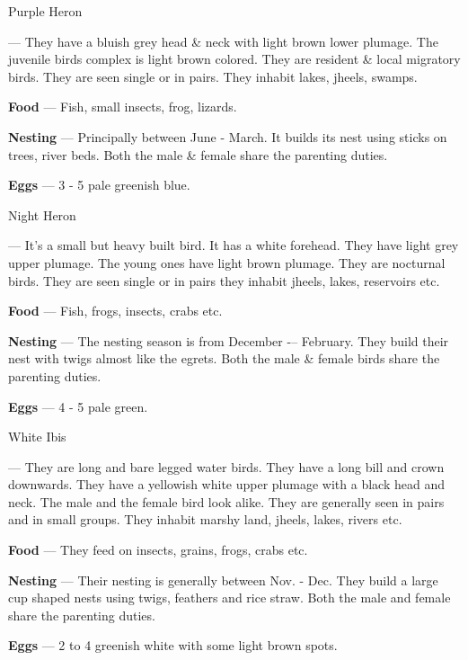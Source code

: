 \begin{bird}{Purple Heron}

 --- They have a bluish grey head \& neck with light brown lower plumage. The juvenile birds complex is light brown colored. They are resident \& local migratory birds. They are seen single or in pairs. They inhabit lakes, jheels, swamps.

{\large\bf Food} --- Fish, small insects, frog, lizards.

{\large\bf Nesting} --- Principally between June - March. It builds its nest using sticks on trees, river beds. Both the male \& female share the parenting duties.

{\large\bf Eggs} --- 3 - 5 pale greenish blue.
\end{bird}

\begin{bird}{Night Heron}

 --- It's a small but heavy built bird. It has a white forehead. They have light grey upper plumage. The young ones have light brown plumage. They are nocturnal birds. They are seen single or in pairs they inhabit jheels, lakes, reservoirs etc.

{\large\bf Food} --- Fish, frogs, insects, crabs etc.

{\large\bf Nesting} --- The nesting season is from December -– February. They build their nest with twigs almost like the egrets. Both the male \& female birds share the parenting duties.

{\bf Eggs} --- 4 - 5 pale green.
\end{bird}


\begin{bird}{White Ibis}

 --- They are long and bare legged water birds. They have a long bill and crown downwards. They have a yellowish white upper plumage with a black head and neck. The male and the female bird look alike. They are generally seen in pairs and in small groups. They inhabit marshy land, jheels, lakes, rivers etc.

{\large\bf Food} --- They feed on insects, grains, frogs, crabs etc.

{\large\bf Nesting} --- Their nesting is generally between Nov. - Dec. They build a large cup shaped nests using twigs, feathers and rice straw. Both the male and female share the parenting duties. 

{\large\bf Eggs} --- 2 to 4 greenish white with some light brown spots.
\end{bird}

